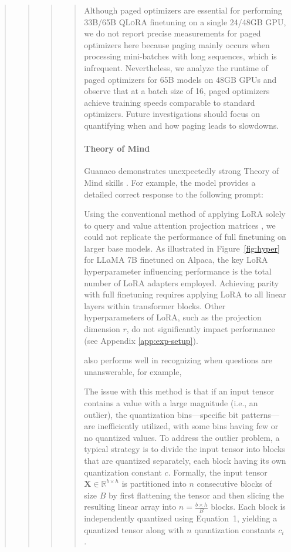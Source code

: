 \begin{quote}
\begin{quote}
\begin{quote}
\begin{quote}
Although paged optimizers are essential for performing 33B/65B \textsc{QLoRA} finetuning on a single 24/48GB GPU, we do not report precise measurements for paged optimizers here because paging mainly occurs when processing mini-batches with long sequences, which is infrequent. Nevertheless, we analyze the runtime of paged optimizers for 65B models on 48GB GPUs and observe that at a batch size of 16, paged optimizers achieve training speeds comparable to standard optimizers. Future investigations should focus on quantifying when and how paging leads to slowdowns.

\paragraph{Theory of Mind} {Guanaco} demonstrates unexpectedly strong Theory of Mind skills \cite{nematzadeh2018evaluating, sap2022neural}. For example, the model provides a detailed correct response to the following prompt:

Using the conventional method of applying LoRA solely to query and value attention projection matrices \citep{hu2021lora}, we could not replicate the performance of full finetuning on larger base models. As illustrated in Figure~\ref{fig:hyper} for LLaMA 7B finetuned on Alpaca, the key LoRA hyperparameter influencing performance is the total number of LoRA adapters employed. Achieving parity with full finetuning requires applying LoRA to all linear layers within transformer blocks. Other hyperparameters of LoRA, such as the projection dimension $r$, do not significantly impact performance (see Appendix \ref{app:exp-setup}).

 also performs well in recognizing when questions are unanswerable, for example,

The issue with this method is that if an input tensor contains a value with a large magnitude (i.e., an outlier), the quantization bins—specific bit patterns—are inefficiently utilized, with some bins having few or no quantized values. To address the outlier problem, a typical strategy is to divide the input tensor into blocks that are quantized separately, each block having its own quantization constant $c$. Formally, the input tensor $\mathbf{X} \in \mathbb{R}^{b \times h}$ is partitioned into $n$ consecutive blocks of size $B$ by first flattening the tensor and then slicing the resulting linear array into $n = \frac{b \times h}{B}$ blocks. Each block is independently quantized using Equation~1, yielding a quantized tensor along with $n$ quantization constants $c_i$.



\end{quote}
\end{quote}
\end{quote}
\end{quote}
